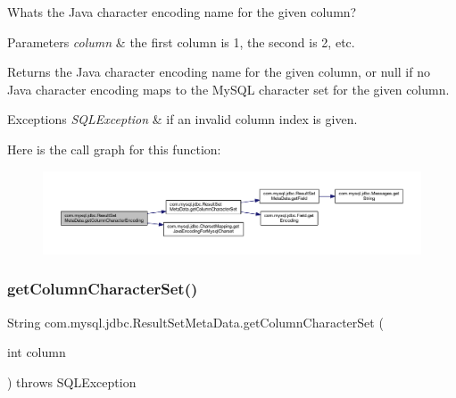 What\textquotesingle{}s the Java character encoding name for the given column?


\begin{DoxyParams}{Parameters}
{\em column} & the first column is 1, the second is 2, etc.\\
\hline
\end{DoxyParams}
\begin{DoxyReturn}{Returns}
the Java character encoding name for the given column, or null if no Java character encoding maps to the My\+S\+QL character set for the given column.
\end{DoxyReturn}

\begin{DoxyExceptions}{Exceptions}
{\em S\+Q\+L\+Exception} & if an invalid column index is given. \\
\hline
\end{DoxyExceptions}
Here is the call graph for this function\+:
\nopagebreak
\begin{figure}[H]
\begin{center}
\leavevmode
\includegraphics[width=350pt]{classcom_1_1mysql_1_1jdbc_1_1_result_set_meta_data_a92e9d337ceb0d64f40d1d4045f8e580c_cgraph}
\end{center}
\end{figure}
\mbox{\label{classcom_1_1mysql_1_1jdbc_1_1_result_set_meta_data_acaf0893c65c1ddcbf1fffdec5a2c011a}} 
\subsubsection{\texorpdfstring{get\+Column\+Character\+Set()}{getColumnCharacterSet()}}
{\footnotesize\ttfamily String com.\+mysql.\+jdbc.\+Result\+Set\+Meta\+Data.\+get\+Column\+Character\+Set (\begin{DoxyParamCaption}\item[{int}]{column }\end{DoxyParamCaption}) throws S\+Q\+L\+Exception}

